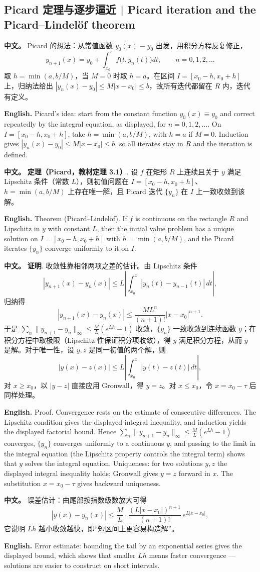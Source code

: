 \documentclass[UTF8,11pt,a4paper]{ctexart}
\newcommand{\APS}[2]{\par\noindent\textbf{中文。} #1\par\noindent\textbf{English.} #2\par}
\begin{document}
\subsection{Picard 定理与逐步逼近 | Picard iteration and the Picard--Lindel\"of theorem}
\APS{Picard 的想法：从常值函数 $y_0(x)\equiv y_0$ 出发，用积分方程反复修正，
\[
y_{n+1}(x)=y_0+\int_{x_0}^{x}f\bigl(t,y_n(t)\bigr)dt,\qquad n=0,1,2,\dots
\]
取 $h=\min(a,b/M)$，当 $M=0$ 时取 $h=a$。在区间 $I=[x_0-h,x_0+h]$ 上，归纳法给出 $|y_n(x)-y_0|\le M|x-x_0|\le b$，故所有迭代都留在 $R$ 内，迭代有定义。}{Picard's idea: start from the constant function $y_0(x)\equiv y_0$ and correct repeatedly by the integral equation, as displayed, for $n=0,1,2,\dots$. On $I=[x_0-h,x_0+h]$, take $h=\min(a,b/M)$, with $h=a$ if $M=0$. Induction gives $|y_n(x)-y_0|\le M|x-x_0|\le b$, so all iterates stay in $R$ and the iteration is defined.}
\APS{\textbf{定理（Picard，教材定理 3.1）}. 设 $f$ 在矩形 $R$ 上连续且关于 $y$ 满足 Lipschitz 条件（常数 $L$），则初值问题在 $I=[x_0-h,x_0+h]$、$h=\min(a,b/M)$ 上存在唯一解，且 Picard 迭代 $\{y_n\}$ 在 $I$ 上一致收敛到该解。}{Theorem (Picard--Lindel\"of). If $f$ is continuous on the rectangle $R$ and Lipschitz in $y$ with constant $L$, then the initial value problem has a unique solution on $I=[x_0-h,x_0+h]$ with $h=\min(a,b/M)$, and the Picard iterates $\{y_n\}$ converge uniformly to it on $I$.}
\APS{\textbf{证明}. 收敛性靠相邻两项之差的估计。由 Lipschitz 条件
\[
|y_{n+1}(x)-y_n(x)|\le L\left|\int_{x_0}^{x}|y_n(t)-y_{n-1}(t)|\,dt\right|,
\]
归纳得
\[
|y_{n+1}(x)-y_n(x)|\le\frac{M L^{n}}{(n+1)!}|x-x_0|^{n+1}.
\]
于是 $\sum_n\|y_{n+1}-y_n\|_\infty\le\frac{M}{L}(e^{Lh}-1)$ 收敛，$\{y_n\}$ 一致收敛到连续函数 $y$；在积分方程中取极限（Lipschitz 性保证积分项收敛），得 $y$ 满足积分方程，从而 $y$ 是解。对于唯一性，设 $y,z$ 是同一初值的两个解，则
\[
|y(x)-z(x)|\le L\left|\int_{x_0}^{x}|y(t)-z(t)|\,dt\right|,
\]
对 $x\ge x_0$，以 $|y-z|$ 直接应用 Gronwall，得 $y=z$。对 $x\le x_0$，令 $x=x_0-\tau$ 后同样处理。}{Proof. Convergence rests on the estimate of consecutive differences. The Lipschitz condition gives the displayed integral inequality, and induction yields the displayed factorial bound. Hence $\sum_n\|y_{n+1}-y_n\|_\infty\le\frac ML(e^{Lh}-1)$ converges, $\{y_n\}$ converges uniformly to a continuous $y$, and passing to the limit in the integral equation (the Lipschitz property controls the integral term) shows that $y$ solves the integral equation. Uniqueness: for two solutions $y,z$ the displayed integral inequality holds; Gronwall gives $y=z$ forward in $x$. The substitution $x=x_0-\tau$ gives backward uniqueness.}
\APS{误差估计：由尾部按指数级数放大可得
\[
|y(x)-y_n(x)|\le\frac{M}{L}\cdot\frac{(L|x-x_0|)^{n+1}}{(n+1)!}\,e^{L|x-x_0|},
\]
它说明 $Lh$ 越小收敛越快，即“短区间上更容易构造解”。}{Error estimate: bounding the tail by an exponential series gives the displayed bound, which shows that smaller $Lh$ means faster convergence --- solutions are easier to construct on short intervals.}
\end{document}
